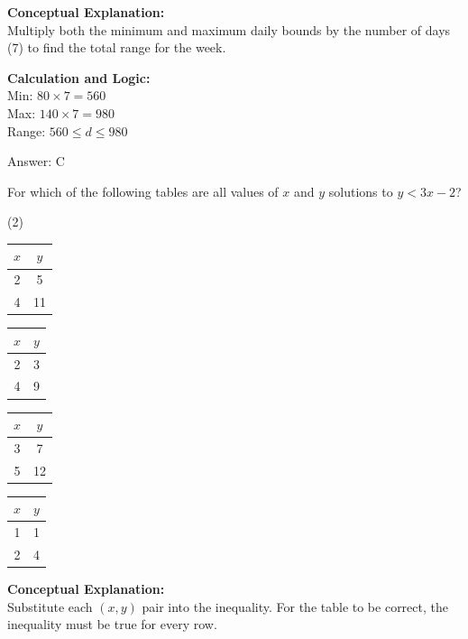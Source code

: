 \documentclass[11pt,paper=a4,answers]{exam}
\begin{document}
\begin{questions}
\begin{solution}
\textbf{Conceptual Explanation:} \\
Multiply both the minimum and maximum daily bounds by the number of days (7) to find the total range for the week.

\vspace{10pt}
\textbf{Calculation and Logic:} \\
Min: $80 \times 7 = 560$ \\
Max: $140 \times 7 = 980$ \\
Range: $560 \le d \le 980$

\vspace{15pt}
Answer: \colorbox{yellow!100}{C}
\end{solution}

\vspace{20pt}

\question
For which of the following tables are all values of $x$ and $y$ solutions to $y < 3x - 2$?
\begin{tasks}(2)
    \task \begin{tabular}{|c|c|} \hline $x$ & $y$ \\ \hline 2 & 5 \\ \hline 4 & 11 \\ \hline \end{tabular}
    \task \begin{tabular}{|c|c|} \hline $x$ & $y$ \\ \hline 2 & 3 \\ \hline 4 & 9 \\ \hline \end{tabular}
    \task \begin{tabular}{|c|c|} \hline $x$ & $y$ \\ \hline 3 & 7 \\ \hline 5 & 12 \\ \hline \end{tabular}
    \task \begin{tabular}{|c|c|} \hline $x$ & $y$ \\ \hline 1 & 1 \\ \hline 2 & 4 \\ \hline \end{tabular}
\end{tasks}

\begin{solution}
\textbf{Conceptual Explanation:} \\
Substitute each $(x, y)$ pair into the inequality. For the table to be correct, the inequality must be true for every row.


\end{solution}
\end{questions}
\end{document}

